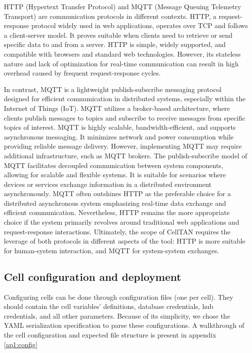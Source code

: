 HTTP (Hypertext Transfer Protocol) and MQTT (Message Queuing Telemetry Transport) are communication protocols in different contexts. HTTP, a request-response protocol widely used in web applications, operates over TCP and follows a client-server model. It proves suitable when clients need to retrieve or send specific data to and from a server. HTTP is simple, widely supported, and compatible with browsers and standard web technologies. However, its stateless nature and lack of optimization for real-time communication can result in high overhead caused by frequent request-response cycles.


In contrast, MQTT is a lightweight publish-subscribe messaging protocol designed for efficient communication in distributed systems, especially within the Internet of Things (IoT). MQTT utilizes a broker-based architecture, where clients publish messages to topics and subscribe to receive messages from specific topics of interest. MQTT is highly scalable, bandwidth-efficient, and supports asynchronous messaging. It minimizes network and power consumption while providing reliable message delivery. However, implementing MQTT may require additional infrastructure, such as MQTT brokers.
The publish-subscribe model of MQTT facilitates decoupled communication between system components, allowing for scalable and flexible systems. It is suitable for scenarios where devices or services exchange information in a distributed environment asynchronously. MQTT often outshines HTTP as the preferable choice for a distributed asynchronous system emphasizing real-time data exchange and efficient communication. Nevertheless, HTTP remains the more appropriate choice if the system primarily revolves around traditional web applications and request-response interactions. Ultimately, the scope of CellTAN requires the leverage of both protocols in different aspects of the tool: HTTP is more suitable for human-system interaction, and MQTT for system-system exchanges.


\subsection{Cell configuration and deployment}


Configuring cells can be done through configuration files (one per cell). They should contain the cell variables' definitions, database credentials, hub credentials, and all other parameters. Because of its simplicity, we chose the YAML serialization specification \cite{yaml} to parse these configurations. A walkthrough of the cell configuration and expected file structure is present in appendix \ref{ap1:config}


